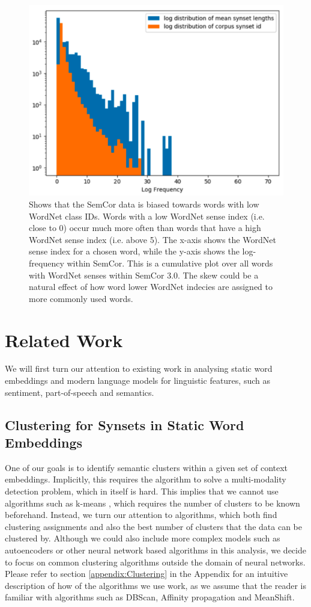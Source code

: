 \documentclass[a4paper,12pt,twoside,openright]{report}
\begin{document}
\begin{figure}[h]
	\center
  \includegraphics[width=0.6\linewidth]{./assets/background/semcor_skew.png}
  \caption{Shows that the SemCor data is biased towards words with low WordNet class IDs. 
  Words with a low WordNet sense index (i.e. close to 0) occur much more often than words that have a high WordNet sense index (i.e. above 5).
  The x-axis shows the WordNet sense index for a chosen word, while the y-axis shows the log-frequency within SemCor. 
  This is a cumulative plot over all words with WordNet senses within SemCor 3.0.
  The skew could be a natural effect of how word lower WordNet indecies are assigned to more commonly used words.
  }
  \label{fig:embeddings_by_language}
\end{figure}


\chapter{Related Work}\label{section:RelatedWork} 

We will first turn our attention to existing work in analysing static word embeddings and modern language models for linguistic features, such as sentiment, part-of-speech and semantics.

\section{Clustering for Synsets in Static Word Embeddings}\label{section_clustering}

One of our goals is to identify semantic clusters within a given set of context embeddings.
Implicitly, this requires the algorithm to solve a multi-modality detection problem, which in itself is hard.
This implies that we cannot use algorithms such as k-means \cite{lloyd57, macqueen67}, which requires the number of clusters to be known beforehand.
Instead, we turn our attention to algorithms, which both find clustering assignments and also the best number of clusters that the data can be clustered by.
Although we could also include more complex models such as autoencoders or other neural network based algorithms in this analysis, we decide to focus on common clustering algorithms outside the domain of neural networks.
Please refer to section \ref{appendix:Clustering} in the Appendix for an intuitive description of how of the algorithms we use work, as we assume that the reader is familiar with algorithms such as DBScan, Affinity propagation and MeanShift.
\end{document}
